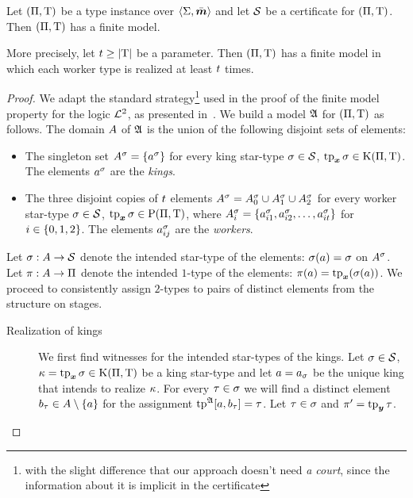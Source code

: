 \begin{lemma}\label{lem:cert-expand}
Let $(\Pi,\mathrm{T})$ be a type instance over $\left\langle \mathrm{\Sigma},\bar{\bm{m}} \right\rangle$ and let $\mathcal{S}$
be a certificate for $(\Pi,\mathrm{T})$.
Then $(\Pi,\mathrm{T})$ has a finite model.

More precisely, let $t \geq \left|\mathrm{T}\right|$ be a parameter.
Then $(\Pi,\mathrm{T})$ has a finite model in which each worker type is realized
at least $t$ times.
\end{lemma}
\begin{proof}
We adapt the standard strategy\footnote{with the slight difference that our
approach doesn't need \emph{a court}, since the information about it is implicit
in the certificate} used in the proof of the finite model property for the logic
$\mathcal{L}^{2}$, as presented in~\cite{gradel1999logics}.
We build a model $\mathfrak{A}$ for $(\Pi,\mathrm{T})$ as follows.
The domain $A$ of $\mathfrak{A}$ is the union of the following disjoint sets of
elements:
\begin{itemize}
  \item
  The singleton set $A^{\sigma} = \left\{a^{\sigma}\right\}$ for every king star-type
  $\sigma\in\mathcal{S}$, $\operatorname{tp}_{\bm{x}}\sigma \in \mathrm{K}(\Pi,\mathrm{T})$.
  The elements $a^{\sigma}$ are the \emph{kings}.
  \item 
  The three disjoint copies of $t$ elements
  $A^{\sigma} = A^{\sigma}_{0} \cup A^{\sigma}_{1} \cup A^{\sigma}_{2}$ for every
  worker star-type $\sigma \in \mathcal{S}$, $\operatorname{tp}_{\bm{x}}\sigma \in \mathrm{P}(\Pi,\mathrm{T})$,
  where $A^{\sigma}_{i} = \left\{a^{\sigma}_{i 1}, a^{\sigma}_{i 2}, \dots,
  a^{\sigma}_{i t}\right\}$ for $i \in \left\{0,1,2\right\}$.
  The elements $a^{\sigma}_{i j}$ are the \emph{workers}.
\end{itemize}
Let $\sigma : A \to \mathcal{S}$ denote the intended star-type of the elements:
$\sigma(a) = \sigma$ on $A^{\sigma}$.
Let $\pi : A \to \Pi$ denote the intended $1$-type of the elements:
$\pi(a) = \operatorname{tp}_{\bm{x}}(\sigma(a))$.
We proceed to consistently assign $2$-types to pairs of distinct elements from
the structure on stages.
\begin{description}
  \item[Realization of kings] We first find witnesses for the intended
  star-types of the kings.
  Let $\sigma \in \mathcal{S}$, $\kappa = \operatorname{tp}_{\bm{x}}\sigma \in \mathrm{K}(\Pi,\mathrm{T})$ be a king
  star-type and let $a = a_{\sigma}$ be the unique king that intends to realize
  $\kappa$.
  For every $\tau \in \sigma$ we will find a distinct element $b_{\tau} \in
  A \setminus \left\{a\right\}$ for the assignment $\operatorname{tp}^{\mathfrak{A}}[a,b_{\tau}] = \tau$.
  Let $\tau \in \sigma$ and ${\pi'} = \operatorname{tp}_{\bm{y}}\tau$.

\end{description}
\end{proof}
